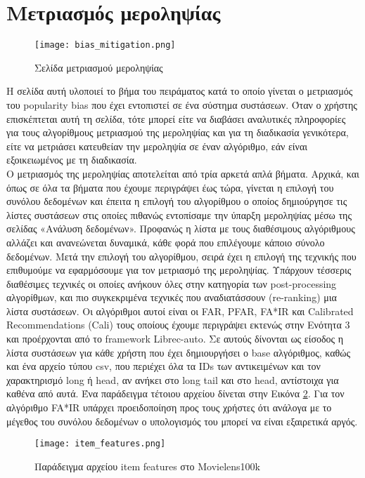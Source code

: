 \section{Μετριασμός μεροληψίας}
\begin{figure}[H]
	\centering
	\texttt{[image: bias\_mitigation.png]}
	\caption{Σελίδα μετριασμού μεροληψίας}
	\label{fig:mitigation}
\end{figure}
\noindent Η σελίδα αυτή υλοποιεί το βήμα του πειράματος κατά το οποίο γίνεται ο μετριασμός του popularity bias που έχει εντοπιστεί σε ένα σύστημα συστάσεων. Όταν ο χρήστης επισκέπτεται αυτή τη σελίδα, τότε μπορεί είτε να διαβάσει αναλυτικές πληροφορίες για τους αλγορίθμους μετριασμού της μεροληψίας και για τη διαδικασία γενικότερα, είτε να μετριάσει κατευθείαν την μεροληψία σε έναν αλγόριθμο, εάν είναι εξοικειωμένος με τη διαδικασία.\\ Ο μετριασμός της μεροληψίας αποτελείται από τρία αρκετά απλά βήματα. Αρχικά, και όπως σε όλα τα βήματα που έχουμε περιγράψει έως τώρα, γίνεται η επιλογή του συνόλου δεδομένων και έπειτα η επιλογή του αλγορίθμου ο οποίος δημιούργησε τις λίστες συστάσεων στις οποίες πιθανώς εντοπίσαμε την ύπαρξη μεροληψίας μέσω της σελίδας «Ανάλυση δεδομένων». Προφανώς η λίστα με τους διαθέσιμους αλγόριθμους αλλάζει και ανανεώνεται δυναμικά, κάθε φορά που επιλέγουμε κάποιο σύνολο δεδομένων. Μετά την επιλογή του αλγορίθμου, σειρά έχει η επιλογή της τεχνικής που επιθυμούμε να εφαρμόσουμε για τον μετριασμό της μεροληψίας. Υπάρχουν τέσσερις διαθέσιμες τεχνικές οι οποίες ανήκουν όλες στην κατηγορία των post-processing αλγορίθμων, και πιο συγκεκριμένα τεχνικές που αναδιατάσσουν (re-ranking) μια λίστα συστάσεων. Οι αλγόριθμοι αυτοί είναι οι FAR, PFAR, FA*IR και Calibrated Recommendations (Cali) τους οποίους έχουμε περιγράψει εκτενώς στην Ενότητα 3 και προέρχονται από το framework Librec-auto. Σε αυτούς δίνονται ως είσοδος η λίστα συστάσεων για κάθε χρήστη που έχει δημιουργήσει ο base αλγόριθμος, καθώς και ένα αρχείο τύπου csv, που περιέχει όλα τα IDs των αντικειμένων και τον χαρακτηρισμό long ή head, αν ανήκει στο long tail και στο head, αντίστοιχα για καθένα από αυτά. Ένα παράδειγμα τέτοιου αρχείου δίνεται στην Εικόνα \ref{fig:feature}. Για τον αλγόριθμο FA*IR υπάρχει προειδοποίηση προς τους χρήστες ότι ανάλογα με το μέγεθος του συνόλου δεδομένων ο υπολογισμός του μπορεί να είναι εξαιρετικά αργός.
\begin{figure}[H]
	\centering
	\texttt{[image: item\_features.png]}
	\caption{Παράδειγμα αρχείου item features στο Movielens100k}
	\label{fig:feature}
\end{figure}
